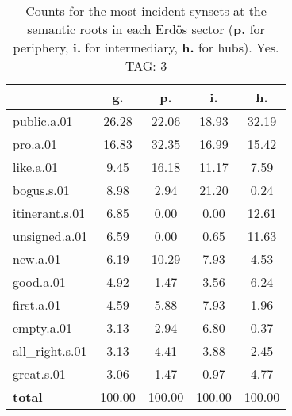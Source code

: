 \begin{table}[h!]
\begin{center}
\begin{tabular}{| l || c | c | c | c |}\hline
 & {\bf g.} & {\bf p.} & {\bf i.} & {\bf h.} \\\hline\hline
public.a.01 & 26.28  & 22.06  & 18.93  & 32.19 \\\hline
pro.a.01 & 16.83  & 32.35  & 16.99  & 15.42 \\\hline
like.a.01 & 9.45  & 16.18  & 11.17  & 7.59 \\\hline
bogus.s.01 & 8.98  & 2.94  & 21.20  & 0.24 \\\hline
itinerant.s.01 & 6.85  & 0.00  & 0.00  & 12.61 \\\hline
unsigned.a.01 & 6.59  & 0.00  & 0.65  & 11.63 \\\hline
new.a.01 & 6.19  & 10.29  & 7.93  & 4.53 \\\hline
good.a.01 & 4.92  & 1.47  & 3.56  & 6.24 \\\hline
first.a.01 & 4.59  & 5.88  & 7.93  & 1.96 \\\hline
empty.a.01 & 3.13  & 2.94  & 6.80  & 0.37 \\\hline
all\_right.s.01 & 3.13  & 4.41  & 3.88  & 2.45 \\\hline
great.s.01 & 3.06  & 1.47  & 0.97  & 4.77 \\\hline\hline
{{\bf total}} & 100.00  & 100.00  & 100.00  & 100.00 \\\hline
\end{tabular}
\caption{Counts for the most incident synsets at the semantic roots in each Erd\"os sector ({\bf p.} for periphery, {\bf i.} for intermediary, {\bf h.} for hubs). Yes. TAG: 3}
\end{center}
\end{table}